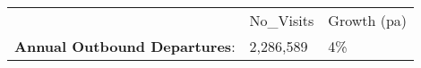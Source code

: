 \begin{tabular}[t]{p{5cm}p{1.3cm}p{1.2cm}}
   & No\_Visits & Growth (pa) \\ 
 \textbf{Annual Outbound Departures}: & 2,286,589 & 4\% \\ 
  \end{tabular}
